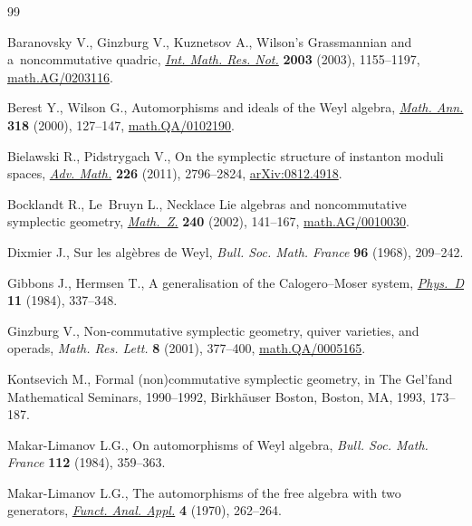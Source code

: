 \documentclass[pdftex]{sigma}
\begin{document}
\begin{thebibliography}{99}
\footnotesize\itemsep=0pt

Baranovsky V., Ginzburg V., Kuznetsov A., Wilson's {G}rassmannian and
  a~noncommutative quadric, \href{http://dx.doi.org/10.1155/S1073792803210126}{\textit{Int. Math. Res. Not.}} \textbf{2003} (2003),
  1155--1197, \href{http://arxiv.org/abs/math.AG/0203116}{math.AG/0203116}.

Berest Y., Wilson G., Automorphisms and ideals of the {W}eyl algebra,
  \href{http://dx.doi.org/10.1007/s002080000115}{\textit{Math. Ann.}} \textbf{318} (2000), 127--147, \href{http://arxiv.org/abs/math.QA/0102190}{math.QA/0102190}.

Bielawski R., Pidstrygach V., On the symplectic structure of instanton moduli
  spaces, \href{http://dx.doi.org/10.1016/j.aim.2010.10.001}{\textit{Adv. Math.}} \textbf{226} (2011), 2796--2824,
  \href{http://arxiv.org/abs/0812.4918}{arXiv:0812.4918}.

Bocklandt R., Le~Bruyn L., Necklace {L}ie algebras and noncommutative
  symplectic geometry, \href{http://dx.doi.org/10.1007/s002090100366}{\textit{Math.~Z.}} \textbf{240} (2002), 141--167,
  \href{http://arxiv.org/abs/math.AG/0010030}{math.AG/0010030}.

Dixmier J., Sur les alg\`ebres de {W}eyl, \textit{Bull. Soc. Math. France}
  \textbf{96} (1968), 209--242.

Gibbons J., Hermsen T., A generalisation of the {C}alogero--{M}oser system,
  \href{http://dx.doi.org/10.1016/0167-2789(84)90015-0}{\textit{Phys.~D}} \textbf{11} (1984), 337--348.

Ginzburg V., Non-commutative symplectic geometry, quiver varieties, and
  operads, \textit{Math. Res. Lett.} \textbf{8} (2001), 377--400,
  \href{http://arxiv.org/abs/math.QA/0005165}{math.QA/0005165}.

Kontsevich M., Formal (non)commutative symplectic geometry, in The {G}el'fand
  {M}athematical {S}eminars, 1990--1992, Birkh\"auser Boston, Boston, MA, 1993,
  173--187.

Makar-Limanov L.G., On automorphisms of {W}eyl algebra, \textit{Bull. Soc.
  Math. France} \textbf{112} (1984), 359--363.

Makar-Limanov L.G., The automorphisms of the free algebra with two generators,
  \href{http://dx.doi.org/10.1007/BF01075252}{\textit{Funct. Anal. Appl.}} \textbf{4} (1970), 262--264.



\end{thebibliography}
\end{document}
